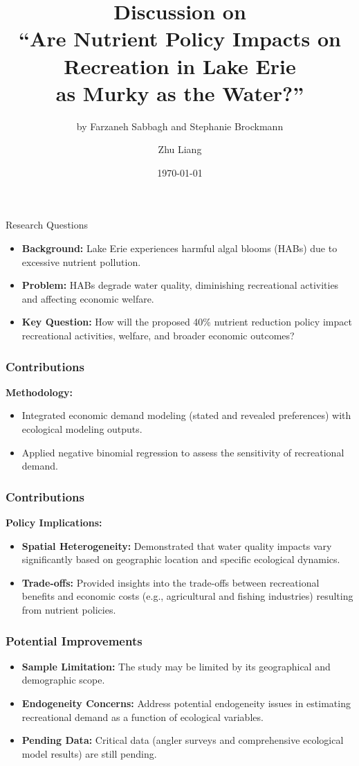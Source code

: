\documentclass[professionalfonts, aspectratio=169]{beamer}
\title{Discussion on \\ ``Are Nutrient Policy Impacts on Recreation in Lake Erie \\ as Murky as the Water?''}
\institute{Stony Brook University}
\subtitle{by Farzaneh Sabbagh and Stephanie Brockmann}
\author{Zhu Liang}
\date{\today}
\begin{document}
\begin{frame}[plain]
  \titlepage
\end{frame}

\begin{frame}{Research Questions}
  \begin{itemize}
      \item \textbf{Background:} Lake Erie experiences harmful algal blooms (HABs) due to excessive nutrient pollution.
      \item \textbf{Problem:} HABs degrade water quality, diminishing recreational activities and affecting economic welfare.
      \item \textbf{Key Question:} How will the proposed 40\% nutrient reduction policy impact recreational activities, welfare, and broader economic outcomes?
  \end{itemize}
\end{frame}

\begin{frame}
  \frametitle{Contributions}
  \textbf{Methodology:}
  \begin{itemize}
    \item Integrated economic demand modeling (stated and revealed preferences) with ecological modeling outputs.
    \item Applied negative binomial regression to assess the sensitivity of recreational demand.
  \end{itemize}
\end{frame}

\begin{frame}
  \frametitle{Contributions}
  \textbf{Policy Implications:}
  \begin{itemize}
    \item \textbf{Spatial Heterogeneity:} Demonstrated that water quality impacts vary significantly based on geographic location and specific ecological dynamics.
    \item \textbf{Trade-offs:} Provided insights into the trade-offs between recreational benefits and economic costs (e.g., agricultural and fishing industries) resulting from nutrient policies.
  \end{itemize}
\end{frame}

\begin{frame}
  \frametitle{Potential Improvements}
  \begin{itemize}
    \item \textbf{Sample Limitation:} The study may be limited by its geographical and demographic scope.
    \item \textbf{Endogeneity Concerns:} Address potential endogeneity issues in estimating recreational demand as a function of ecological variables.
    \item \textbf{Pending Data:} Critical data (angler surveys and comprehensive ecological model results) are still pending.
  \end{itemize}
\end{frame}
\end{document}
